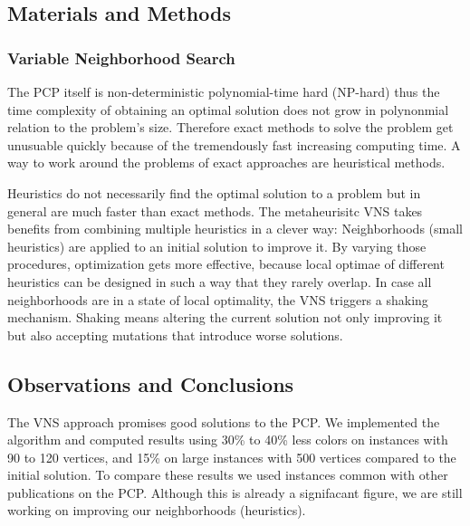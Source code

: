\documentclass[paper = a4, fontsize = 10pt]{scrartcl}
\begin{document}
\subsection*{Materials and Methods}

\subsubsection*{Variable Neighborhood Search}
The PCP itself is non-deterministic polynomial-time hard (NP-hard) thus the time complexity of obtaining an optimal solution does not grow in polynonmial relation to the problem's size. Therefore exact methods to solve the problem get unusuable quickly because of the tremendously fast increasing computing time. A way to work around the problems of exact approaches are heuristical methods.

Heuristics do not necessarily find the optimal solution to a problem but in general are much faster than exact methods. The metaheurisitc VNS takes benefits from combining multiple heuristics in a clever way: Neighborhoods (small heuristics) are applied to an initial solution to improve it. By varying those procedures, optimization gets more effective, because local optimae of different heuristics can be designed in such a way that they rarely overlap. In case all neighborhoods are in a state of local optimality, the VNS triggers a shaking mechanism. Shaking means altering the current solution not only improving it but also accepting mutations that introduce worse solutions.

\subsection*{Observations and Conclusions}

The VNS approach promises good solutions to the PCP. We implemented the algorithm and computed results using 30\% to 40\% less colors on instances with 90 to 120 vertices, and 15\% on large instances with 500 vertices compared to the initial solution. To compare these results we used instances common with other publications on the PCP. Although this is already a signifacant figure, we are still working on improving our neighborhoods (heuristics).
\end{document}
